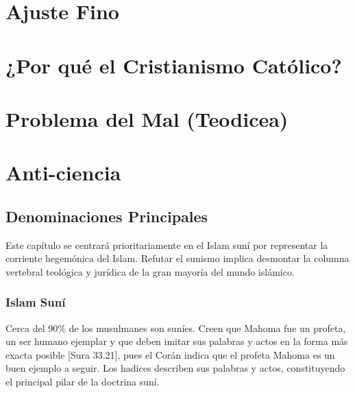 \documentclass[12pt]{report}
\begin{document}
	\section{Ajuste Fino}
	
	
	\section{¿Por qué el Cristianismo Católico?}
	

	\section{Problema del Mal (Teodicea)}
	
	\section{Anti-ciencia}
	
	
	
	
	
	
	
	
	\subsection{Denominaciones Principales}
	
	\begin{boxless1}
		Este capítulo se centrará prioritariamente en el Islam suní por representar la corriente hegemónica del Islam. Refutar el sunismo implica desmontar la columna vertebral teológica y jurídica de la gran mayoría del mundo islámico.
	\end{boxless1}
	
	\subsubsection{Islam Suní} %
	Cerca del 90\% de los musulmanes son suníes. Creen que Mahoma fue un profeta, un ser humano ejemplar y que deben imitar sus palabras y actos en la forma más exacta posible [Sura 33.21], pues el Corán indica que el profeta Mahoma es un buen ejemplo a seguir. Los hadices describen sus palabras y actos, constituyendo el principal pilar de la doctrina suní.
	
\end{document}
